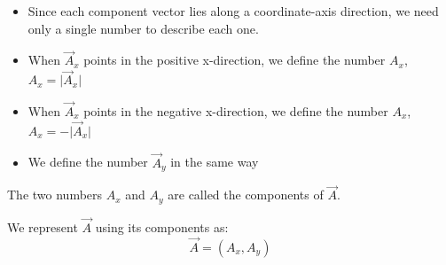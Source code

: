 \documentclass[]{beamer}
\begin{document}
\begin{frame}



\begin{itemize}
\item Since each component vector lies along a coordinate-axis direction, we need
only a single number to describe each one.

\pause

\item When $\vec{A}_x$ points in the positive x-direction, we define the number $A_x$,  $A_x=\lvert \vec{A}_x \rvert$

\pause


\item  When $\vec{A}_x$ points in the negative x-direction, we define the number $A_x$,  $A_x=-\lvert \vec{A}_x \rvert$

\pause


\item We define the number $\vec{A}_y$ in the same way
\end{itemize}

\vspace{5 mm}
\pause

 The two numbers $A_x$ and $A_y$ are called the components of $\vec{A}$.
\pause

\vspace{5 mm}
We represent $\vec{A}$ using its components as:
\begin{equation}
\vec{A}=(A_x,A_y)
\end{equation}

 \end{frame}
 
\end{document}
